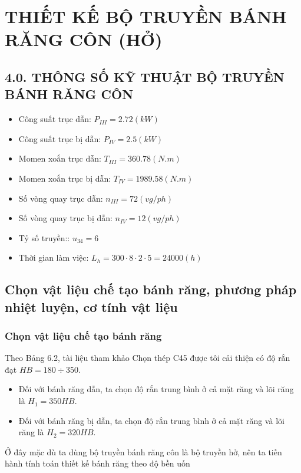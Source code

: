 \chapter{THIẾT KẾ BỘ TRUYỀN BÁNH RĂNG CÔN (HỞ)}
    \section*{4.0. THÔNG SỐ KỸ THUẬT BỘ TRUYỀN BÁNH RĂNG CÔN}
        \begin{itemize}
            \item Công suất trục dẫn: $P_{III} = 2.72 (kW)$
            \item Công suất trục bị dẫn: $P_{IV} = 2.5 (kW)$
            \item Momen xoắn trục dẫn: $T_{III} = 360.78 (N.m)$
            \item Momen xoắn trục bị dẫn: $T_{IV} = 1989.58 (N.m)$
            \item Số vòng quay trục dẫn: $n_{III} = 72 (vg/ph)$
            \item Số vòng quay trục bị dẫn: $n_{IV} = 12 (vg/ph)$
            \item Tỷ số truyền:: $u_{34} = 6$
            \item Thời gian làm việc: $L_h = 300 \cdot 8 \cdot 2 \cdot 5 = 24000 (h)$
        \end{itemize}
    \section{Chọn vật liệu chế tạo bánh răng, phương pháp nhiệt luyện, cơ tính vật liệu}
        \subsection{Chọn vật liệu chế tạo bánh răng}
            \hspace*{0.6cm}Theo Bảng 6.2, tài liệu tham khảo \cite{tltk1} Chọn thép C45 được tôi cải thiện có độ rắn đạt $HB = 180 \div 350$. 
            \begin{itemize}
                \item Đối với bánh răng dẫn, ta chọn độ rắn trung bình ở cả mặt răng và lõi răng là $H_{1} = 350 HB$. 
                \item Đối với bánh răng bị dẫn, ta chọn độ rắn trung bình ở cả mặt răng và lõi răng là $H_{2} = 320 HB$.
            \end{itemize}
            \hspace*{0.6cm}Ở đây mặc dù ta dùng bộ truyền bánh răng côn là bộ truyền hở, nên ta tiến hành tính toán thiết kế bánh răng theo độ bền uốn
